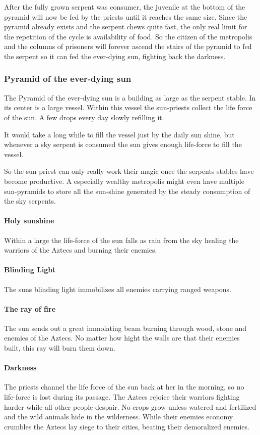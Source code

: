 \documentclass[a4paper]{book}
\begin{document}
After the fully grown serpent was consumer, the juvenile at the bottom of the
pyramid will now be fed by the priests until it reaches the same size. Since
the pyramid already exists and the serpent chews quite fast, the only real
limit for the repetition of the cycle is availability of food. So the citizen
of the metropolis and the columns of prisoners will forever ascend the stairs
of the pyramid to fed the serpent so it can fed the ever-dying sun, fighting
back the darkness.

\subsubsection{Pyramid of the ever-dying sun}
The Pyramid of the ever-dying sun is a building as large as the serpent stable.
In its center is a large vessel. Within this vessel the sun-priests collect the
life force of the sun. A few drops every day slowly refilling it.

It would take a long while to fill the vessel just by the daily sun shine, but
whenever a sky serpent is consumed the sun gives enough life-force to fill the
vessel.

So the sun priest can only really work their magic once the serpents stables
have become productive. A especially wealthy metropolis might even have
multiple sun-pyramids to store all the sun-shine generated by the steady
consumption of the sky serpents.

\paragraph{Holy sunshine}
Within a large the life-force of the sun falls as rain from the sky healing the
warriors of the \gls{Aztecs} and burning their enemies.

\paragraph{Blinding Light}
The suns blinding light immobilizes all enemies carrying ranged weapons.

\paragraph{The ray of fire}
The sun sends out a great immolating beam burning through wood, stone and
enemies of the \gls{Aztecs}. No matter how hight the walls are that their
enemies built, this ray will burn them down.

\paragraph{Darkness}
The priests channel the life force of the sun back at her in the morning, so no
life-force is lost during its passage. The \gls{Aztecs} rejoice their warriors
fighting harder while all other people despair. No crops grow unless watered
and fertilized and the wild animals hide in the wilderness. While their enemies
economy crumbles the \gls{Aztecs} lay siege to their cities, beating their
demoralized enemies.
\end{document}
